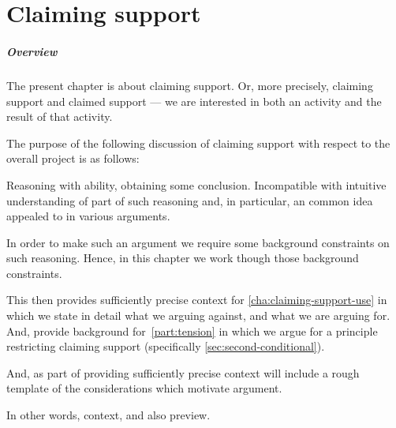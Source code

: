  \chapter{Claiming support}
\label{cha:claiming-support}

\paragraph*{Overview}

\begin{note}
  The present chapter is about claiming support.
  Or, more precisely, claiming support and claimed support --- we are interested in both an activity and the result of that activity.

  The purpose of the following discussion of claiming support with respect to the {\color{red} overall project} is as follows:

  Reasoning with ability, obtaining some conclusion.
  Incompatible with intuitive understanding of part of such reasoning and, in particular, an common idea appealed to in various arguments.

  In order to make such an argument we require some background constraints on such reasoning.
  Hence, in this chapter we work though those background constraints.

  This then provides sufficiently precise context for \autoref{cha:claiming-support-use} in which we state in detail what we arguing against, and what we are arguing for.
  And, provide background for~\autoref{part:tension} in which we argue for a principle restricting claiming support (specifically \autoref{sec:second-conditional}).

  And, as part of providing sufficiently precise context will include a rough template of the considerations which motivate argument.

  In other words, context, and also preview.
\end{note}

